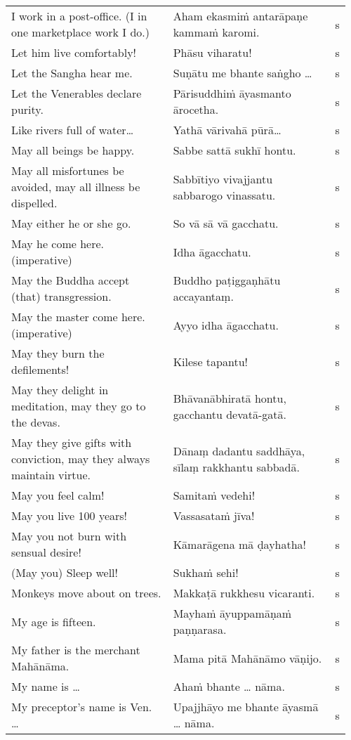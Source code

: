 \documentclass[a5paper]{memoir}
\begin{document}
\begin{longtable}{L{0.48\linewidth} L{0.48\linewidth} H}
I work in a post-office. (I in one marketplace work I do.) & Aham ekasmiṁ antarāpaṇe kammaṁ karomi. & s\\[0pt]
Let him live comfortably! & Phāsu viharatu! & s\\[0pt]
Let the Sangha hear me. & Suṇātu me bhante saṅgho \ldots{} & s\\[0pt]
Let the Venerables declare purity. & Pārisuddhiṁ āyasmanto ārocetha. & s\\[0pt]
Like rivers full of water\ldots{} & Yathā vārivahā pūrā\ldots{} & s\\[0pt]
May all beings be happy. & Sabbe sattā sukhī hontu. & s\\[0pt]
May all misfortunes be avoided, may all illness be dispelled. & Sabbītiyo vivajjantu sabbarogo vinassatu. & s\\[0pt]
May either he or she go. & So vā sā vā gacchatu. & s\\[0pt]
May he come here. (imperative) & Idha āgacchatu. & s\\[0pt]
May the Buddha accept (that) transgression. & Buddho paṭiggaṇhātu accayantaṃ. & s\\[0pt]
May the master come here. (imperative) & Ayyo idha āgacchatu. & s\\[0pt]
May they burn the defilements! & Kilese tapantu! & s\\[0pt]
May they delight in meditation, may they go to the devas. & Bhāvanābhiratā hontu, gacchantu devatā-gatā. & s\\[0pt]
May they give gifts with conviction, may they always maintain virtue. & Dānaṃ dadantu saddhāya, sīlaṃ rakkhantu sabbadā. & s\\[0pt]
May you feel calm! & Samitaṁ vedehi! & s\\[0pt]
May you live 100 years! & Vassasataṁ jīva! & s\\[0pt]
May you not burn with sensual desire! & Kāmarāgena mā ḍayhatha! & s\\[0pt]
(May you) Sleep well! & Sukhaṁ sehi! & s\\[0pt]
Monkeys move about on trees. & Makkaṭā rukkhesu vicaranti. & s\\[0pt]
My age is fifteen. & Mayhaṁ āyuppamāṇaṁ paṇṇarasa. & s\\[0pt]
My father is the merchant Mahānāma. & Mama pitā Mahānāmo vāṇijo. & s\\[0pt]
My name is \ldots{} & Ahaṁ bhante \ldots{} nāma. & s\\[0pt]
My preceptor's name is Ven. \ldots{} & Upajjhāyo me bhante āyasmā \ldots{} nāma. & s\\[0pt]

\end{longtable}
\end{document}
